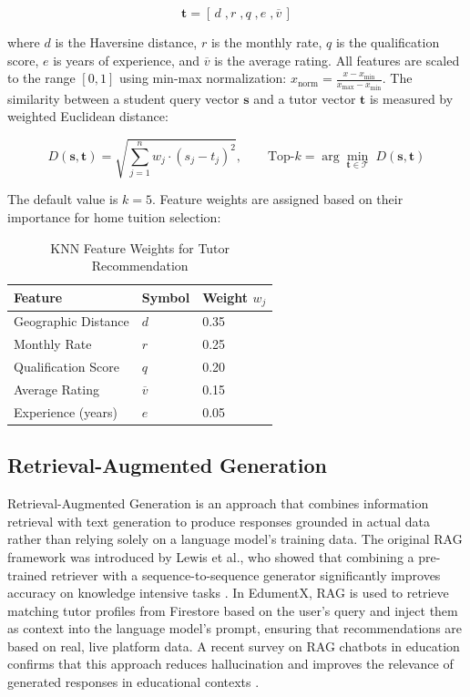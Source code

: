 \documentclass[12pt]{report}
\begin{document}
\begin{equation}
\mathbf{t} = [\,d\;, r\;, q\;, e\;, \overline{v}\,]
\end{equation}

\noindent where $d$ is the Haversine distance, $r$ is the monthly rate, $q$ is the qualification score, $e$ is years of experience, and $\overline{v}$ is the average rating. All features are scaled to the range $[0, 1]$ using min-max normalization: $x_{\text{norm}} = \frac{x - x_{\min}}{x_{\max} - x_{\min}}$. The similarity between a student query vector $\mathbf{s}$ and a tutor vector $\mathbf{t}$ is measured by weighted Euclidean distance:

\begin{equation}
D(\mathbf{s}, \mathbf{t}) = \sqrt{\sum_{j=1}^{n} w_j \cdot \left(s_j - t_j\right)^2}, \qquad
\text{Top-}k = \arg\min_{\mathbf{t} \in \mathcal{T}}\; D(\mathbf{s}, \mathbf{t})
\end{equation}

\noindent The default value is $k = 5$. Feature weights are assigned based on their importance for home tuition selection:

\begin{table}[H]
\centering
\caption{KNN Feature Weights for Tutor Recommendation}
\vspace{5pt}
\begin{tabular}{|l|l|l|}
\hline
Feature & Symbol & Weight $w_j$ \\
\hline
Geographic Distance & $d$ & 0.35 \\
Monthly Rate & $r$ & 0.25 \\
Qualification Score & $q$ & 0.20 \\
Average Rating & $\overline{v}$ & 0.15 \\
Experience (years) & $e$ & 0.05 \\
\hline
\end{tabular}
\end{table}

\subsection{Retrieval-Augmented Generation}

Retrieval-Augmented Generation is an approach that combines information retrieval with text generation to produce responses grounded in actual data rather than relying solely on a language model's training data. The original RAG framework was introduced by Lewis et al., who showed that combining a pre-trained retriever with a sequence-to-sequence generator significantly improves accuracy on knowledge intensive tasks \citep{lewis2021}. In EdumentX, RAG is used to retrieve matching tutor profiles from Firestore based on the user's query and inject them as context into the language model's prompt, ensuring that recommendations are based on real, live platform data. A recent survey on RAG chatbots in education confirms that this approach reduces hallucination and improves the relevance of generated responses in educational contexts \citep{swacha2025}.
\end{document}
